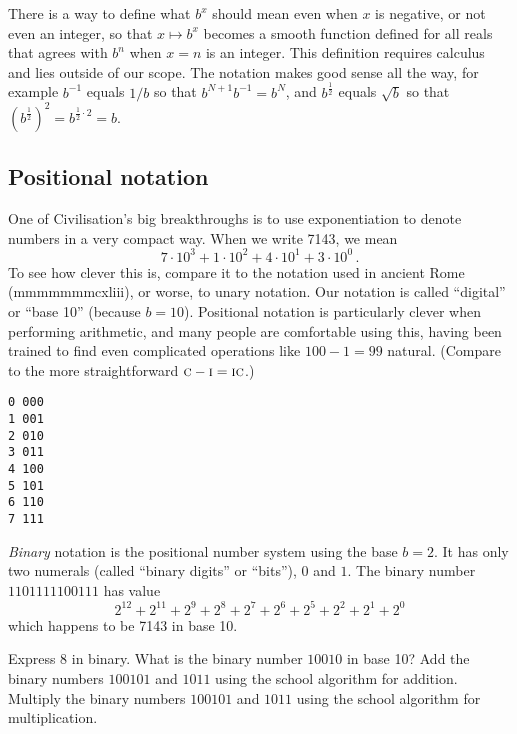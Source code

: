 \documentclass[a4paper,nobib]{tufte-handout}
\begin{document}
There is a way to define what $b^x$ should mean even when $x$ is
negative, or not even an integer, so that $x\mapsto b^x$ becomes a
smooth function defined for all reals that agrees with $b^n$ when $x=n$ is
an integer. This definition requires calculus and lies outside of our
scope.  The notation makes good sense all the way, for example
$b^{-1}$ equals $1/b$ so that $b^{N+1}b^{-1}= b^N$, and
$b^{\frac{1}{2}}$ equals $\sqrt b$ so that $(b^{\frac{1}{2}})^2 =
b^{\frac{1}{2}\cdot 2} = b$.

\subsection{Positional notation}

One of Civilisation's big breakthroughs is to use exponentiation to
denote numbers in a very compact way. When we write 7143, we mean \[
7\cdot 10^3 + 1\cdot 10^2 + 4\cdot 10^1 + 3\cdot 10^0 \,.\]
To see how clever this is, compare it to the notation used in ancient Rome
({\sc mmmmmmmcxliii}), or worse, to unary notation. 
Our notation is called ``digital'' or ``base 10'' (because
$b=10$). 
Positional notation is particularly clever when performing
arithmetic, 
and many people are comfortable using this, having been trained to find
even complicated operations like $100-1=99$ natural. (Compare to the
more straightforward $\mbox{\sc c}-\mbox{\sc i} = \mbox{\sc ic}$.)

\begin{marginfigure}
\begin{verbatim}
0 000
1 001
2 010
3 011
4 100
5 101
6 110
7 111
\end{verbatim}
\end{marginfigure}

\emph{Binary} notation is the positional number system using the base
$b=2$.
It has only two numerals (called ``binary
digits'' or ``bits''), $0$ and $1$.
The binary number $1101111100111$ has value 
\[ 2^{12} + 2^{11} + 2^9 + 2^8 + 2^7 +2^6 + 2^5 + 2^2 + 2^1 +2^0   \]
which happens to be 7143 in base 10. 

\begin{ExerciseList}
\Exercise
Express 8 in binary. What is the binary number $10010$ in base 10?
\Exercise Add the binary numbers $100101$ and $1011$ using the
school algorithm for addition.
\Exercise Multiply the binary numbers $100101$ and $1011$ using the school algorithm for multiplication.
\end{ExerciseList}
\end{document}
